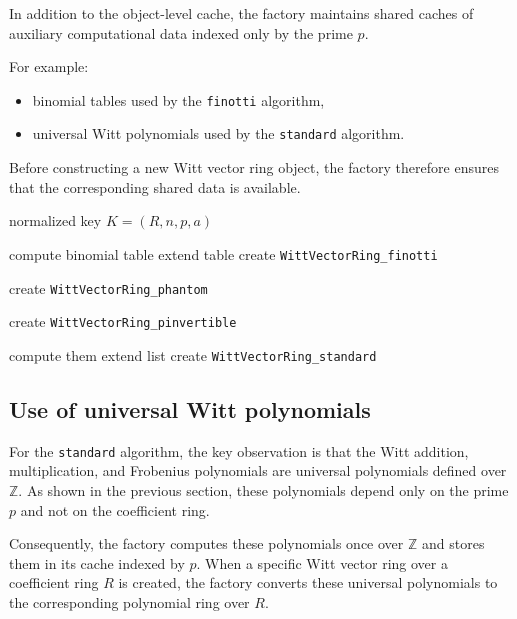 \documentclass[oneside, a4paper, onecolumn, 11pt]{article}
\theoremstyle{definition}
\begin{document}
In addition to the object-level cache, the factory maintains shared caches of auxiliary computational data indexed only by the prime $p$.

For example:

\begin{itemize}
\item binomial tables used by the \texttt{finotti} algorithm,
\item universal Witt polynomials used by the \texttt{standard} algorithm.
\end{itemize}

Before constructing a new Witt vector ring object, the factory therefore ensures that the corresponding shared data is available.

\begin{algorithm}[H]
\caption{Factory dispatch and precomputation}
\begin{algorithmic}[1]
\Require normalized key $K=(R,n,p,a)$

        \State compute binomial table
        \State extend table
    \EndIf
    \State create \texttt{WittVectorRing\_finotti}

    \State create \texttt{WittVectorRing\_phantom}

    \State create \texttt{WittVectorRing\_pinvertible}

\Else
        \State compute them
        \State extend list
    \EndIf
    \State create \texttt{WittVectorRing\_standard}
\EndIf
\end{algorithmic}
\end{algorithm}


\subsection{Use of universal Witt polynomials}

For the \texttt{standard} algorithm, the key observation is that the Witt addition, multiplication, and Frobenius polynomials are universal polynomials defined over $\mathbb{Z}$. As shown in the previous section, these polynomials depend only on the prime $p$ and not on the coefficient ring.

Consequently, the factory computes these polynomials once over $\mathbb{Z}$ and stores them in its cache indexed by $p$. When a specific Witt vector ring over a coefficient ring $R$ is created, the factory converts these universal polynomials to the corresponding polynomial ring over $R$.
\end{document}

